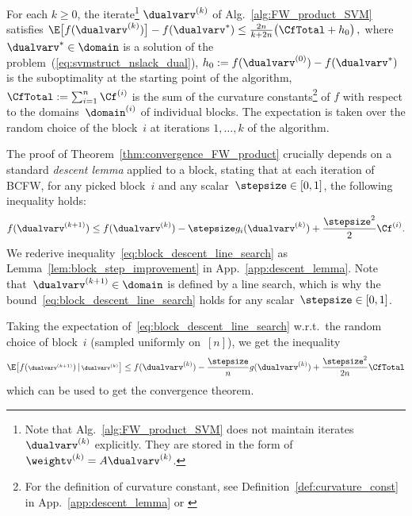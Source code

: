 \documentclass{article}
\begin{document}
\begin{theorem} \label{thm:convergence_FW_product}
For each $k\ge 0$, the iterate\footnote{Note that Alg.~\ref{alg:FW_product_SVM} does not maintain iterates~$\dualvarv^{(k)}$ explicitly.
They are stored in the form of~$\weightv^{(k)} = A \dualvarv^{(k)}$\!.} 
$\dualvarv^{(k)}$ of %
Alg.~\ref{alg:FW_product_SVM} satisfies
$
\E\big[f(\dualvarv^{(k)})\big] - f(\dualvarv^*) \le \frac{2n}{k+2n}\big(\CfTotal+ h_0\big) \, ,
$
where $\dualvarv^*\in \domain$ is a solution of the problem~(\ref{eq:svmstruct_nslack_dual}), $h_0 := f(\dualvarv^{(0)}) - f(\dualvarv^*)$ is the suboptimality at the starting point of the algorithm, $\CfTotal := \sum_{i=1}^n \Cf^{(i)}$ is the sum of the curvature constants\footnote{For the definition of curvature constant, see Definition~\ref{def:curvature_const} in App.~\ref{app:descent_lemma} or \citep[App.~A]{LacosteJulien2015linearFW}} of $f$ with respect to the domains~$\domain^{(i)}$ of individual blocks.
The expectation is taken over the random choice of the block~$i$ at iterations $1,\dots,k$ of the algorithm.
%
%
%
%
%
\end{theorem}

The proof of Theorem~\ref{thm:convergence_FW_product} crucially depends on a standard \emph{descent lemma} applied to a block, stating that at each iteration of BCFW, for any picked block~$i$ and any scalar~$\stepsize \in [0,1]$, the following inequality holds:
\begin{equation}
\label{eq:block_descent_line_search}
  f(\dualvarv^{(k+1)})
  \le f(\dualvarv^{(k)}) - \stepsize g_i(\dualvarv^{(k)}) + \frac{\stepsize^2}{2}  \Cf^{(i)}.
\end{equation}
We rederive inequality~\eqref{eq:block_descent_line_search} as Lemma~\ref{lem:block_step_improvement} in App.~\ref{app:descent_lemma}.
Note that~$\dualvarv^{(k+1)} \in \domain$ is defined by a line search, which is why the bound~\eqref{eq:block_descent_line_search} holds for any scalar~$\stepsize \in [0,1]$.

%
%
%
%
%
%
%
%
%

Taking the expectation of~\eqref{eq:block_descent_line_search} w.r.t.\ the random choice of block~$i$ (sampled uniformly on~$[n]$), we get the inequality
\begin{equation}
\label{eq:expected_descent_line_search}
\E\big[ f( {\scriptstyle \dualvarv^{(k+1)}})\,|\, {\scriptstyle \dualvarv^{(k)} }\big]
  \le f(\dualvarv^{(k)}) - \frac{\stepsize}{n} g(\dualvarv^{(k)}) + \frac{\stepsize^2}{2n} \CfTotal
\end{equation}
which can be used to get the convergence theorem.
%
%
%
%
%
%
%
\end{document}
